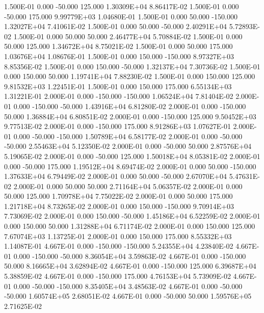   1.500E-01     0.000   -50.000   125.000 1.30309E+04 8.86417E-02
  1.500E-01     0.000   -50.000   175.000 9.99779E+03 1.04680E-01
  1.500E-01     0.000    50.000  -150.000 1.32027E+04 7.41061E-02
  1.500E-01     0.000    50.000   -50.000 2.40291E+04 5.72893E-02
  1.500E-01     0.000    50.000    50.000 2.46477E+04 5.70884E-02
  1.500E-01     0.000    50.000   125.000 1.34672E+04 8.75021E-02
  1.500E-01     0.000    50.000   175.000 1.03676E+04 1.08676E-01
  1.500E-01     0.000   150.000  -150.000 8.97327E+03 8.85356E-02
  1.500E-01     0.000   150.000   -50.000 1.32137E+04 7.30736E-02
  1.500E-01     0.000   150.000    50.000 1.19741E+04 7.88230E-02
  1.500E-01     0.000   150.000   125.000 9.81532E+03 1.22451E-01
  1.500E-01     0.000   150.000   175.000 6.55134E+03 1.31221E-01
  2.000E-01     0.000  -150.000  -150.000 1.06524E+04 7.81404E-02
  2.000E-01     0.000  -150.000   -50.000 1.43916E+04 6.81280E-02
  2.000E-01     0.000  -150.000    50.000 1.36884E+04 6.80851E-02
  2.000E-01     0.000  -150.000   125.000 9.50452E+03 9.77513E-02
  2.000E-01     0.000  -150.000   175.000 8.91286E+03 1.07627E-01
  2.000E-01     0.000   -50.000  -150.000 1.50789E+04 6.58177E-02
  2.000E-01     0.000   -50.000   -50.000 2.55463E+04 5.12350E-02
  2.000E-01     0.000   -50.000    50.000 2.87576E+04 5.19065E-02
  2.000E-01     0.000   -50.000   125.000 1.50018E+04 8.05381E-02
  2.000E-01     0.000   -50.000   175.000 1.19512E+04 8.69474E-02
  2.000E-01     0.000    50.000  -150.000 1.37633E+04 6.79449E-02
  2.000E-01     0.000    50.000   -50.000 2.67070E+04 5.47631E-02
  2.000E-01     0.000    50.000    50.000 2.71164E+04 5.06357E-02
  2.000E-01     0.000    50.000   125.000 1.70978E+04 7.75022E-02
  2.000E-01     0.000    50.000   175.000 1.21718E+04 8.73265E-02
  2.000E-01     0.000   150.000  -150.000 9.70914E+03 7.73069E-02
  2.000E-01     0.000   150.000   -50.000 1.45186E+04 6.52259E-02
  2.000E-01     0.000   150.000    50.000 1.31288E+04 6.71174E-02
  2.000E-01     0.000   150.000   125.000 7.67074E+03 1.13725E-01
  2.000E-01     0.000   150.000   175.000 8.55332E+03 1.14087E-01
  4.667E-01     0.000  -150.000  -150.000 5.24355E+04 4.23840E-02
  4.667E-01     0.000  -150.000   -50.000 8.36054E+04 3.59863E-02
  4.667E-01     0.000  -150.000    50.000 8.16665E+04 3.62894E-02
  4.667E-01     0.000  -150.000   125.000 6.39687E+04 5.38859E-02
  4.667E-01     0.000  -150.000   175.000 4.76153E+04 5.73909E-02
  4.667E-01     0.000   -50.000  -150.000 8.35405E+04 3.48563E-02
  4.667E-01     0.000   -50.000   -50.000 1.60574E+05 2.68051E-02
  4.667E-01     0.000   -50.000    50.000 1.59576E+05 2.71625E-02
